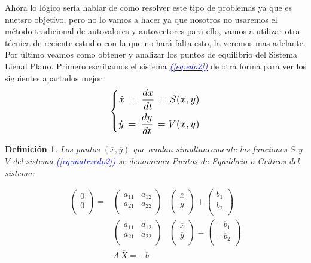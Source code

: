 \documentclass[12pt,a4paper]{report} %
\newtheorem{definicion}{Definición} %
\newcommand{\eref}[1]{\hyperref[#1]{\textcolor{blue}{\textit{(\ref*{#1})}}}}
\begin{document}
	Ahora lo lógico sería hablar de como resolver este tipo de problemas ya que es nuetsro objetivo, pero no lo vamos a hacer ya que nosotros no usaremos el método tradicional de autovalores y autovectores para ello, vamos a utilizar otra técnica de reciente estudio con la que no hará falta esto, la veremos mas adelante.\\[0.5cm]
	Por último veamos como obtener y analizar los puntos de equilibrio del Sistema Lienal Plano. Primero escribamos el sistema \eref{eq:edo2} de otra forma para ver los siguientes apartados mejor:
	\begin{equation}
		\label{eq:sv}
		\scalebox{1.2}{$\displaystyle
			\left\{
			\begin{aligned}
				\dot{x}\,=\,\frac{dx}{dt}\,=S(x,y) \\
				\dot{y}\,=\,\frac{dy}{dt}\,=V(x,y)
			\end{aligned}
			\right.
			$}
	\end{equation}\smallskip
	
	\begin{definicion}
		Los puntos $(\overline{x},\overline{y})$ que anulan simultaneamente las funciones $S$ y $V$ del sistema \eref{eq:matrxedo2} se denominan Puntos de Equilibrio o Críticos del sistema:
	\end{definicion}

	\begin{eqnarray}
		\label{eq:crit}
			\begin{pmatrix}
				0\\
				0\\
			\end{pmatrix} =
			&\begin{pmatrix}
				a_{11} & a_{12}\\
				a_{21} & a_{22}\\
			\end{pmatrix}&
			\begin{pmatrix}
				\overline{x}\\
				\overline{y}\\
			\end{pmatrix} + 
			\begin{pmatrix}
				b_1\\
				b_2\\
			\end{pmatrix}\nonumber \\[4mm]
			&\begin{pmatrix}
			a_{11} & a_{12}\\
			a_{21} & a_{22}\\
			\end{pmatrix}&
			\begin{pmatrix}
			\overline{x}\\
			\overline{y}\\
			\end{pmatrix} = 
			\begin{pmatrix}
			-b_1\\
			-b_2\\
			\end{pmatrix} \nonumber \\[4mm]
			&A\,\overline{X}=-b
	\end{eqnarray}\smallskip
	
\end{document}
